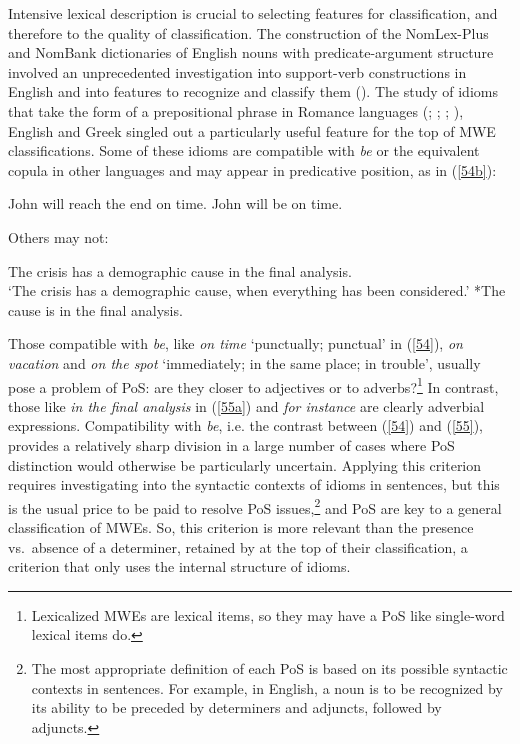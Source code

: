\documentclass[output=paper]{langsci/langscibook}
\begin{document}
Intensive lexical description is crucial to selecting features for classification, and therefore to the quality of classification. The construction of the NomLex-Plus and NomBank dictionaries of English nouns with predicate-argument structure involved an unprecedented investigation into support-verb constructions in English and into features to recognize and classify them (\citealt{Meyers2007}). The study of idioms that take the form of a prepositional phrase in Romance languages (\citealt{Danlos1980}; \citealt{Ranchhod1990}; \citealt{gross1996}; \citealt{Vietri1996}), English \citep{Machonis1988} and Greek \citep{Moustaki1995} singled out a particularly useful feature for the top of MWE classifications. Some of these idioms are compatible with \textit{be} or the equivalent copula in other languages and may appear in predicative position, as in (\ref{54b}):

\begin{exe}
\ex \label{54}
\begin{xlist}
\ex \label{54a}
John will reach the end on time.
\ex \label{54b}
John will be  on time.
\end{xlist}
\end{exe}

\noindent Others may not:


\begin{exe}
\ex \label{55}
\begin{xlist}
\ex \label{55a}
The crisis has a demographic cause in the final analysis.\\
‘The crisis has a demographic cause, when everything has been considered.’
\ex \label{55b}
*The cause is in the final analysis.
\end{xlist}
\end{exe}


\noindent Those compatible with \textit{be}, like \textit{on time} ‘punctually; punctual’ in (\ref{54}), \textit{on vacation} and \textit{on the spot} ‘immediately; in the same place; in trouble’, usually pose a problem of PoS: are they closer to adjectives or to adverbs?\footnote{ Lexicalized MWEs are lexical items, so they may have a PoS like single-word lexical items do.} In contrast, those like \textit{in the final analysis} in (\ref{55a}) and \textit{for instance} are clearly adverbial expressions. Compatibility with \textit{be}, i.e. the contrast between (\ref{54}) and (\ref{55}), provides a relatively sharp division in a large number of cases where PoS distinction would otherwise be particularly uncertain. Applying this criterion requires investigating into the syntactic contexts of idioms in sentences, but this is the usual price to be paid to resolve PoS issues,\footnote{ The most appropriate definition of each PoS is based on its possible syntactic contexts in sentences. For example, in English, a noun is to be recognized by its ability to be preceded by determiners and adjuncts, followed by adjuncts.} and PoS are key to a general classification of MWEs. So, this criterion is more relevant than the presence vs.~absence of a determiner, retained by  \citet[278]{Baldwin2010} at the top of their classification, a criterion that only uses the internal structure of idioms. 
\end{document}
